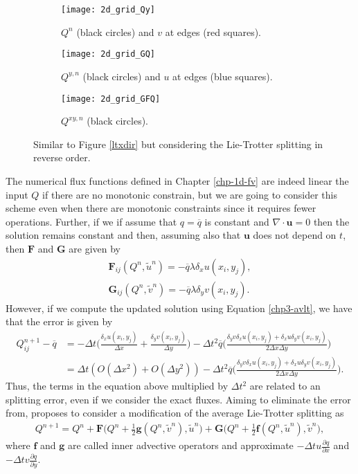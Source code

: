 \begin{figure}[!htb]
	\centering
	\begin{subfigure}{0.3\textwidth}
		\centering
		\texttt{[image: 2d\_grid\_Qy]}
		\caption{$Q^n$ (black circles) and $v$ at edges (red squares). \label{lt-Qy}}
	\end{subfigure}
	\begin{subfigure}{0.3\textwidth}
		\centering
		\texttt{[image: 2d\_grid\_GQ]}
		\caption{$Q^{y,n}$ (black circles) and $u$ at edges (blue squares).\label{lt-GQy} }
	\end{subfigure}
	\begin{subfigure}{0.3\textwidth}
		\centering
		\texttt{[image: 2d\_grid\_GFQ]}
		\caption{$Q^{xy,n}$ (black circles). \label{lt-FGQy}}
	\end{subfigure}
	\caption{Similar to Figure \ref{ltxdir} but considering the Lie-Trotter splitting in reverse order.}
\end{figure}
The numerical flux functions defined in Chapter \ref{chp-1d-fv} are indeed linear the 
input $Q$ if there are no monotonic constrain, but we are going to consider this scheme
even when there are monotonic constraints since it requires fewer operations.
Further, if we if assume that $q = \overline{q}$ is constant and $\nabla \cdot 
\boldsymbol{u} = 0$ then the solution remains constant and then, assuming also that
$\boldsymbol{u}$ does not depend on $t$, then $\mathbf{F}$ and $\mathbf{G}$ are given by
\begin{align*}
	\mathbf{F}_{ij}(Q^n,\tilde{u}^n) = -\overline{q} \lambda {\delta_x} u(x_i,y_j),\\
	\mathbf{G}_{ij}(Q^n,\tilde{v}^n) = -\overline{q} \lambda {\delta_y} v(x_i,y_j).
\end{align*}
However, if we compute the updated solution using Equation \eqref{chp3-avlt}, we have that the error is given by
\begin{align}
	\label{chp3-avlt-error}
	Q^{n+1}_{ij} - \overline{q} &= 
	-\Delta t \bigg(\frac{\delta_x u(x_i,y_j)}{\Delta x} + 	\frac{\delta_y v(x_i,y_j)}{\Delta y} \bigg)
	-\Delta t^2 \overline{q}\bigg( \frac{\delta_y v \delta_x u(x_i,y_j) + \delta_x u\delta_y v(x_i,y_j)}{2\Delta x \Delta y} \bigg) \\
	&= \Delta t (O(\Delta x^2) + O(\Delta y^2))
	   -\Delta t^2 \overline{q}\bigg( \frac{\delta_y v \delta_x u(x_i,y_j) + \delta_x u\delta_y v(x_i,y_j)}{2\Delta x \Delta y} \bigg).
\end{align}
Thus, the terms in the equation above multiplied by $\Delta t^2$ are related to an splitting error, even if we consider the exact fluxes.
Aiming to eliminate the error from, \citet{lin:1996} proposes to consider a modification of the average Lie-Trotter splitting as
\begin{align}
	\label{chp3-avlt2}
	Q^{n+1} = Q^n +  
	\mathbf{F}\bigg(Q^n + \frac{1}{2}\mathbf{g}(Q^n, \tilde{v}^n), \tilde{u}^n \bigg) +  
	\mathbf{G}\bigg(Q^n + \frac{1}{2}\mathbf{f}(Q^n, \tilde{u}^n), \tilde{v}^n \bigg),
\end{align}
where $\mathbf{f}$ and $\mathbf{g}$ are called inner advective operators and approximate
$-\Delta t u \frac{\partial q}{\partial x}$ and $-\Delta t v \frac{\partial q}{\partial y}$.


